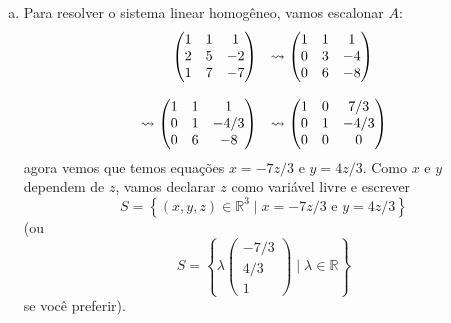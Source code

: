 \documentclass[a4paper,10pt]{article}
\def\R{\mathbb R}
\newenvironment{sol}{\begin{tcolorbox}[breakable,colback=blue!5!white,colframe=blue!40!white,title=\normalsize {\sc{Solução}},coltitle=black]}{\end{tcolorbox}}
\begin{document}
\begin{sol}
	\begin{enumerate}[a)]
		\item Para resolver o sistema linear homogêneo, vamos escalonar $A$:
		\[\begin{array}{rl}
		\begin{pmatrix}
		1&1&1\\2&5&-2\\1&7&-7
		\end{pmatrix}&\rightsquigarrow\begin{pmatrix}
		1&1&1\\0&3&-4\\0&6&-8
		\end{pmatrix}\cr\cr
		\rightsquigarrow\begin{pmatrix}
		1&1&1\\0&1&-4/3\\0&6&-8
		\end{pmatrix}&\rightsquigarrow\begin{pmatrix}
		1&0&7/3\\0&1&-4/3\\0&0&0
		\end{pmatrix}
		\end{array}\]agora vemos que temos equações $x=-7z/3$ e $y=4z/3$. Como $x$ e $y$ dependem de $z$, vamos declarar $z$ como variável livre e escrever
		\[S=\left\{(x,y,z)\in\R^3\mid x=-7z/3\mbox{ e }y=4z/3\right\}\] (ou
		\[S=\left\{\lambda\begin{pmatrix}
		-7/3\\4/3\\1
		\end{pmatrix}\mid \lambda\in \R\right\}\]se você preferir).
		

\end{enumerate}
\end{sol}
\end{document}
